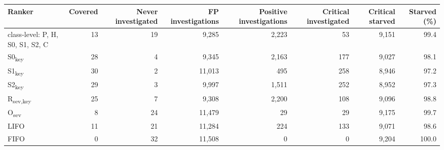 \begin{tabular}{lrrrrrrr}
\toprule
Ranker & Covered & Never investigated & FP investigations & Positive investigations & Critical investigated & Critical starved & Starved (\%) \\
\midrule
class-level: P, H, S0, S1, S2, C & 13 & 19 & 9,285 & 2,223 & 53 & 9,151 & 99.4 \\
S0\textsubscript{key} & 28 & 4 & 9,345 & 2,163 & 177 & 9,027 & 98.1 \\
S1\textsubscript{key} & 30 & 2 & 11,013 & 495 & 258 & 8,946 & 97.2 \\
S2\textsubscript{key} & 29 & 3 & 9,997 & 1,511 & 252 & 8,952 & 97.3 \\
R\textsubscript{sev,key} & 25 & 7 & 9,308 & 2,200 & 108 & 9,096 & 98.8 \\
O\textsubscript{sev} & 8 & 24 & 11,479 & 29 & 29 & 9,175 & 99.7 \\
LIFO & 11 & 21 & 11,284 & 224 & 133 & 9,071 & 98.6 \\
FIFO & 0 & 32 & 11,508 & 0 & 0 & 9,204 & 100.0 \\
\bottomrule
\end{tabular}
